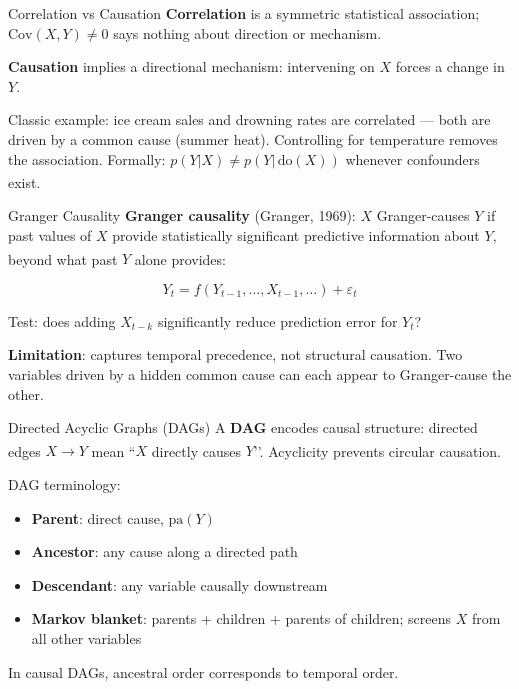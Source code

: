 \begin{v3topic}{Correlation vs Causation}
    \textbf{Correlation} is a symmetric statistical association;
    $\mathrm{Cov}(X,Y) \neq 0$ says nothing about direction or mechanism.

    \textbf{Causation} implies a directional mechanism: intervening on $X$
    forces a change in $Y$.

    Classic example: ice cream sales and drowning rates are correlated ---
    both are driven by a common cause (summer heat). Controlling for
    temperature removes the association. Formally: $p(Y|X) \neq p(Y|\,\mathrm{do}(X))$
    whenever confounders
    exist.\textsuperscript{\cite[][Ch.~1]{pearlBookWhyNew2018}}

\end{v3topic}
\begin{v3topic}{Granger Causality}
    \textbf{Granger causality} (Granger, 1969): $X$ Granger-causes $Y$ if past
    values of $X$ provide statistically significant predictive information
    about $Y$, beyond what past $Y$ alone
    provides:\textsuperscript{\cite[][Ch.~2]{nessCausalAI2025}}

    \[ Y_t = f(Y_{t-1}, \ldots, X_{t-1}, \ldots) + \varepsilon_t \]

    Test: does adding $X_{t-k}$ significantly reduce prediction error for $Y_t$?

    \textbf{Limitation}: captures temporal precedence, not structural
    causation. Two variables driven by a hidden common cause can each appear
    to Granger-cause the other.

\end{v3topic}
\begin{v3topic}{Directed Acyclic Graphs (DAGs)}
    A \textbf{DAG} encodes causal structure: directed edges $X \to Y$ mean
    ``$X$ directly causes $Y$’’. Acyclicity prevents circular
    causation.\textsuperscript{\cite[][pp.~25--27]{barberBayesianReasoningMachine2012}}

    DAG terminology:
    \begin{itemize}
        \item \textbf{Parent}: direct cause, $\mathrm{pa}(Y)$
        \item \textbf{Ancestor}: any cause along a directed path
        \item \textbf{Descendant}: any variable causally downstream
        \item \textbf{Markov blanket}: parents + children + parents of children;
              screens $X$ from all other variables
    \end{itemize}

    In causal DAGs, ancestral order corresponds to temporal order.

\end{v3topic}
